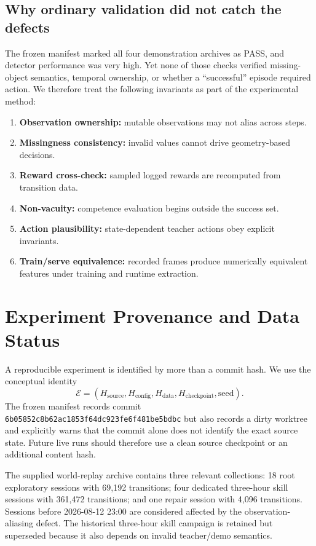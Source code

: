 \documentclass[11pt]{article}
\begin{document}
\subsection{Why ordinary validation did not catch the defects}
The frozen manifest marked all four demonstration archives as PASS, and detector performance was very high. Yet none of those checks verified missing-object semantics, temporal ownership, or whether a ``successful'' episode required action. We therefore treat the following invariants as part of the experimental method:
\begin{enumerate}[leftmargin=1.4em]
  \item \textbf{Observation ownership:} mutable observations may not alias across steps.
  \item \textbf{Missingness consistency:} invalid values cannot drive geometry-based decisions.
  \item \textbf{Reward cross-check:} sampled logged rewards are recomputed from transition data.
  \item \textbf{Non-vacuity:} competence evaluation begins outside the success set.
  \item \textbf{Action plausibility:} state-dependent teacher actions obey explicit invariants.
  \item \textbf{Train/serve equivalence:} recorded frames produce numerically equivalent features under training and runtime extraction.
\end{enumerate}

\section{Experiment Provenance and Data Status}
A reproducible experiment is identified by more than a commit hash. We use the conceptual identity
\begin{equation}
\mathcal E=(H_{\mathrm{source}},H_{\mathrm{config}},H_{\mathrm{data}},H_{\mathrm{checkpoint}},\mathrm{seed}).
\end{equation}
The frozen manifest records commit \texttt{6b05852c8b62ac1853f64dc923fe6f481be5bdbc} but also records a dirty worktree and explicitly warns that the commit alone does not identify the exact source state. Future live runs should therefore use a clean source checkpoint or an additional content hash.

The supplied world-replay archive contains three relevant collections: 18 root exploratory sessions with 69,192 transitions; four dedicated three-hour skill sessions with 361,472 transitions; and one repair session with 4,096 transitions. Sessions before 2026-08-12 23:00 are considered affected by the observation-aliasing defect. The historical three-hour skill campaign is retained but superseded because it also depends on invalid teacher/demo semantics.
\end{document}
